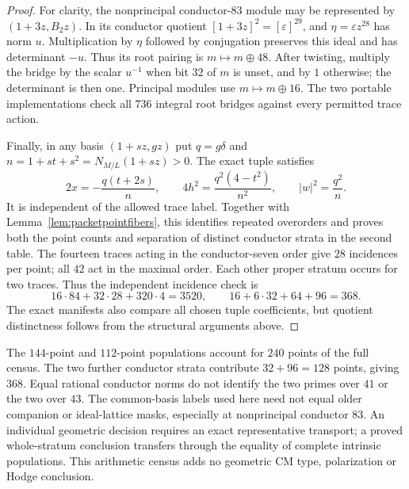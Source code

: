 \begin{proof}
For clarity, the nonprincipal conductor-$83$ module may be represented
by $(1+3z,B_2z)$.  In its conductor quotient
$[1+3z]^2=[\varepsilon]^{29}$, and
$\eta=\varepsilon z^{28}$ has norm $u$.
Multiplication by $\eta$ followed by conjugation preserves this ideal
and has determinant $-u$.  Thus its root pairing is
$m\mapsto m\oplus48$.  After twisting, multiply the bridge by the
scalar $u^{-1}$ when bit $32$ of $m$ is unset, and by $1$ otherwise;
the determinant is then one.  Principal modules use $m\mapsto m\oplus16$.
The two portable implementations check all $736$ integral root bridges
against every permitted trace action.

Finally, in any basis $(1+sz,gz)$ put
$q=g\delta$ and $n=1+st+s^2=N_{M/L}(1+sz)>0$.
The exact tuple satisfies
\[
 2x=-\frac{q(t+2s)}n,\qquad
 4h^2=\frac{q^2(4-t^2)}{n^2},\qquad |w|^2=\frac{q^2}n.
\]
It is independent of the allowed trace label.  Together with
Lemma~\ref{lem:packetpointfibers}, this identifies repeated overorders
and proves both the point counts and separation of distinct conductor
strata in the second table.  The fourteen traces acting in the
conductor-seven order give $28$ incidences per point; all $42$ act in
the maximal order.  Each other proper stratum occurs for two traces.
Thus the independent incidence check is
\[
 16\cdot84+32\cdot28+320\cdot4=3520,
 \qquad 16+6\cdot32+64+96=368.
\]
The exact manifests also compare all chosen tuple coefficients, but
quotient distinctness follows from the structural arguments above.
\end{proof}

\begin{remark}
The $144$-point and $112$-point populations account for $240$ points of
the full census.  The two further conductor strata contribute
$32+96=128$ points, giving $368$.  Equal rational conductor norms do
not identify the two primes over $41$ or the two over $43$.
The common-basis labels used here need not equal older companion or
ideal-lattice masks, especially at nonprincipal conductor $83$.
An individual geometric decision requires an exact representative
transport; a proved whole-stratum conclusion transfers through the
equality of complete intrinsic populations.  This arithmetic census
adds no geometric CM type, polarization or Hodge conclusion.
\end{remark}


